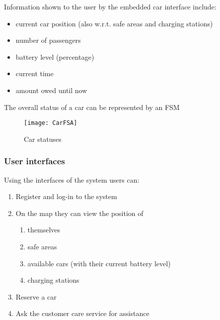 	Information shown to the user by the embedded car interface include:
	\begin{itemize}
		\item current car position (also w.r.t. safe areas and charging stations)
		\item number of passengers
		\item battery level (percentage)
		\item current time
		\item amount owed until now
	\end{itemize}

	The overall status of a car can be represented by an FSM 
	\begin{figure}[h]
			\centering
			\texttt{[image: CarFSA]}
			\caption{
				\label{fig:carFSA} 
				Car statuses
			}
		\end{figure}
		
\subsubsection{User interfaces}
	Using the interfaces of the system users can:
	\begin{enumerate}
		\item Register and log-in to the system
		\item On the map they can view the position of
			\begin{enumerate}[label=\alph*)]
				\item themselves
				\item safe areas
				\item available cars (with their current battery level)
				\item charging stations
			\end{enumerate}
		\item Reserve a car
		\item Ask the customer care service for assistance 
	\end{enumerate}


